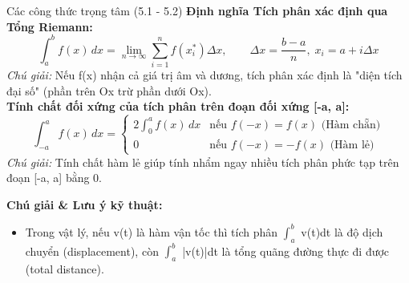 \documentclass[11pt,a4paper,oneside]{book}
\begin{document}
\begin{congthuc}{Các công thức trọng tâm (5.1 - 5.2)}
\noindent\textbf{Định nghĩa Tích phân xác định qua Tổng Riemann:}
\[ \int_a^b f(x)\,dx = \lim_{n \to \infty} \sum_{i=1}^n f(x_i^*) \Delta x, \qquad \Delta x = \frac{b - a}{n}, \; x_i = a + i\Delta x \]
\noindent\textit{Chú giải:} Nếu f(x) nhận cả giá trị âm và dương, tích phân xác định là "diện tích đại số" (phần trên Ox trừ phần dưới Ox).\\[4pt]
\noindent\textbf{Tính chất đối xứng của tích phân trên đoạn đối xứng [-a, a]:}
\[ \int_{-a}^a f(x)\,dx = \begin{cases} 2\int_0^a f(x)\,dx & \text{nếu } f(-x) = f(x) \text{ (Hàm chẵn)} \\ 0 & \text{nếu } f(-x) = -f(x) \text{ (Hàm lẻ)} \end{cases} \]
\noindent\textit{Chú giải:} Tính chất hàm lẻ giúp tính nhẩm ngay nhiều tích phân phức tạp trên đoạn [-a, a] bằng 0.\\[4pt]
\end{congthuc}

\noindent\textbf{Chú giải \& Lưu ý kỹ thuật:}
\begin{itemize}[leftmargin=1.5em, itemsep=2pt]
  \item Trong vật lý, nếu v(t) là hàm vận tốc thì tích phân $\int_a^b$ v(t)dt là độ dịch chuyển (displacement), còn $\int_a^b$ |v(t)|dt là tổng quãng đường thực đi được (total distance).
\end{itemize}

\end{document}
